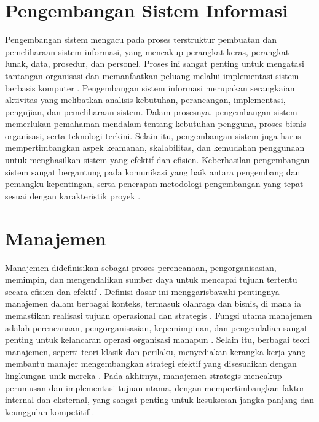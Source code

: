 
\section{Pengembangan Sistem Informasi}
Pengembangan sistem mengacu pada proses terstruktur pembuatan dan pemeliharaan sistem informasi, yang mencakup perangkat keras, perangkat lunak, data, prosedur, dan personel. Proses ini sangat penting untuk mengatasi tantangan organisasi dan memanfaatkan peluang melalui implementasi sistem berbasis komputer \cite{efendi2023perkembangan}. Pengembangan sistem informasi merupakan serangkaian aktivitas yang melibatkan analisis kebutuhan, perancangan, implementasi, pengujian, dan pemeliharaan sistem. Dalam prosesnya, pengembangan sistem memerlukan pemahaman mendalam tentang kebutuhan pengguna, proses bisnis organisasi, serta teknologi terkini. Selain itu, pengembangan sistem juga harus mempertimbangkan aspek keamanan, skalabilitas, dan kemudahan penggunaan untuk menghasilkan sistem yang efektif dan efisien. Keberhasilan pengembangan sistem sangat bergantung pada komunikasi yang baik antara pengembang dan pemangku kepentingan, serta penerapan metodologi pengembangan yang tepat sesuai dengan karakteristik proyek \cite{efendi2023perkembangan}.

\section{Manajemen}
Manajemen didefinisikan sebagai proses perencanaan, pengorganisasian, memimpin, dan mengendalikan sumber daya untuk mencapai tujuan tertentu secara efisien dan efektif \cite{kaehler2019concept}. Definisi dasar ini menggarisbawahi pentingnya manajemen dalam berbagai konteks, termasuk olahraga dan bisnis, di mana ia memastikan realisasi tujuan operasional dan strategis \cite{kaehler2019concept}. Fungsi utama manajemen adalah perencanaan, pengorganisasian, kepemimpinan, dan pengendalian sangat penting untuk kelancaran operasi organisasi manapun \cite{feng2009internal}. Selain itu, berbagai teori manajemen, seperti teori klasik dan perilaku, menyediakan kerangka kerja yang membantu manajer mengembangkan strategi efektif yang disesuaikan dengan lingkungan unik mereka \cite{hussain2019management}. Pada akhirnya, manajemen strategis mencakup perumusan dan implementasi tujuan utama, dengan mempertimbangkan faktor internal dan eksternal, yang sangat penting untuk kesuksesan jangka panjang dan keunggulan kompetitif \cite{schuhly2022strategic}.


